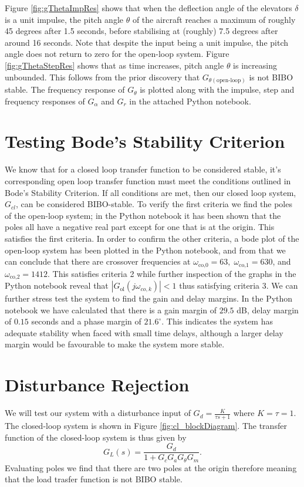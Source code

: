 \documentclass[10pt,a4paper]{article}
\begin{document}
    Figure \ref{fig:gThetaImpRes} shows that when the deflection angle of the elevators $\delta$ is a unit impulse, the pitch angle $\theta$ of the aircraft reaches a maximum of roughly 45 degrees after 1.5 seconds, before stabilising at (roughly) 7.5 degrees after around 16 seconds. Note that despite the input being a unit impulse, the pitch angle does not return to zero for the open-loop system.    Figure \ref{fig:gThetaStepRes} shows that as time increases, pitch angle $\theta$ is increasing unbounded. This follows from the prior discovery that $G_{\theta(\text{open-loop})}$ is not BIBO stable. The frequency response of $G_\theta$ is plotted along with the impulse, step and frequency responses of $G_\alpha$ and $G_r$ in the attached Python notebook.
    \section{Testing Bode's Stability Criterion}
    We know that for a closed loop transfer function to be considered stable, it's corresponding open loop transfer function must meet the conditions outlined in Bode's Stability Criterion. If all conditions are met, then our closed loop system, $G_{cl}$, can be considered BIBO-stable. To verify the first criteria we find the poles of the open-loop system; in the Python notebook it has been shown that the poles all have a negative real part except for one that is at the origin. This satisfies the first criteria. In order to confirm the other criteria, a bode plot of the open-loop system has been plotted in the Python notebook, and from that we can conclude that there are crossover frequencies at $\omega_{\text{co,0}}=63, \; \omega_{\text{co,1}} = 630$, and $\omega_{\text{co,2}} = 1412$. This satisfies criteria 2 while further inspection of the graphs in the Python notebook reveal that $|G_{\text{ol}}(j\omega_{co,k})| < 1$ thus satisfying criteria 3. We can further stress test the system to find the gain and delay margins. In the Python notebook we have calculated that there is a gain margin of $29.5$ dB, delay margin of $0.15$ seconds and a phase margin of $21.6^\circ$. This indicates the system has adequate stability when faced with small time delays, although a larger delay margin would be favourable to make the system more stable.
    
    \section{Disturbance Rejection}
    We will test our system with a disturbance input of $G_d = \frac{K}{\tau s + 1}$ where $K = \tau = 1$. The closed-loop system is shown in Figure \ref{fig:cl_blockDiagram}. The transfer function of the closed-loop system is thus given by
    \begin{equation}
        G_{L}(s) = \frac{G_d}{1 + G_c G_a G_\theta G_m}.
    \end{equation}
    Evaluating poles we find that there are two poles at the origin therefore meaning that the load trasfer function is not BIBO stable.
\end{document}
